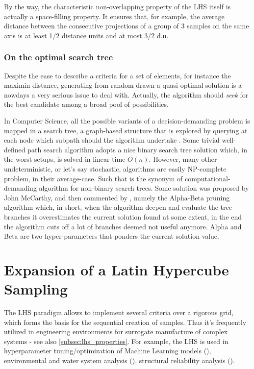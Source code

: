 \documentclass[12pt]{extarticle}
\begin{document}
By the way, the characteristic non-overlapping property of the LHS itself is actually a space-filling property. It ensures that, for example, the average distance between the consecutive projections of a group of 3 samples on the same axis is at least 1/2 distance units and at most 3/2 d.u.

\subsubsection{On the optimal search tree}
\label{subsubsec:search_trees}
Despite the ease to describe a criteria for a set of elements, for instance the maximin distance, generating from random drawn a quasi-optimal solution is a nowdays a very serious issue to deal with. Actually, the algorithm should \textit{seek} for the best candidate among a broad pool of possibilities.

In Computer Science, all the possible variants of a decision-demanding problem is mapped in a search tree, a graph-based structure that is explored by querying at each node which subpath should the algorithm undertake . Some trivial well-defined path search algorithm adopts a nice binary search tree solution which, in the worst setups, is solved in linear time $O(n)$. However, many other undeterministic, or let's say stochastic, algorithms are easily NP-complete problem, in their average-case. Such that is the synonym of computational-demanding algorithm for non-binary search trees. Some solution was proposed by John McCarthy, and then commented by , namely the Alpha-Beta pruning algorithm which, in short, when the algorithm deepen and evaluate the tree branches it overestimates the current solution found at some extent, in the end the algorithm cuts off a lot of branches deemed not useful anymore. Alpha and Beta are two hyper-parameters that ponders the current solution value.

\section{Expansion of a Latin Hypercube Sampling}
\label{sec:lhs_expansion}
The LHS paradigm allows to implement several criteria over a rigorous grid, which forms the basis for the sequential creation of samples. Thus it's frequently utilized in engineering environments for surrogate manufacture of complex systems - see also \cref{subsec:lhs_properties}. For example, the LHS is used in hyperparameter tuning/optimization of Machine Learning models (), environmental and water system analysis (), structural reliability analysis ().
\end{document}
